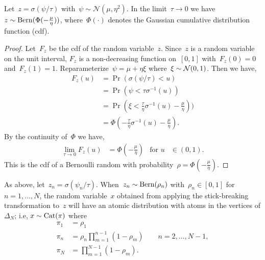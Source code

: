 \documentclass[twoside]{article}
\begin{document}
\begin{proposition}
  \label{prop:bernoulli}
  Let~${z=\sigma(\psi / \tau)}$
  with~${\psi\sim\mathcal{N}(\mu,\eta^2)}$.  In the
  limit~${\tau \to
    0}$ we have~${z \sim \mathrm{Bern}(\Phi(-\tfrac{\mu}{\eta}))}$,
  where~$\Phi(\cdot)$ denotes the Gaussian cumulative distribution
  function (cdf). 
\end{proposition}

\begin{proof}
  Let~$F_z$ be the cdf of the random variable~$z$. Since~$z$ is a random
  variable on the unit interval, $F_z$ is a non-decreasing function
  on~$[0,1]$ with~${F_z(0)=0}$ and~${F_z(1)=1}$.
  Reparameterize~${\psi = \mu + \eta \xi}$
  where~${\xi \sim \mathcal{N}(0,1)}$. Then we have,
  \begin{align*}
    F_z(u) &= \Pr(\sigma(\psi / \tau) < u) \\
         &= \Pr(\psi < \tau \sigma^{-1}(u)) \\
         &= \Pr(\xi < \tfrac{\tau}{\eta} \sigma^{-1}(u) - \tfrac{\mu}{\eta}))\\
         &= \Phi(-\tfrac{\tau}{\eta}\sigma^{-1}(u) - \tfrac{\mu}{\eta}).
  \end{align*}
  By the continuity of~$\Phi$ we have,
  \begin{align*}
    \lim_{\tau \to 0} F_z(u) &= \Phi(-\tfrac{\mu}{\eta}) &
    \text{for } u &\in (0,1).
  \end{align*}
  This is the cdf of a Bernoulli random with
  probability~${\rho = \Phi(-\tfrac{\mu}{\eta})}$.
\end{proof}

\begin{proposition}
  \label{prop:categorical}
  As above, let~${z_n=\sigma(\psi_n / \tau)}$.
  When~${z_n \sim \mathrm{Bern}(\rho_n)}$
  with~${\rho_n \in [0,1]}$ for~${n=1, \ldots, N}$, the random
  variable~$x$ obtained from applying the stick-breaking
  transformation to~$z$ will have an atomic distribution with atoms
  in the vertices of $\Delta_{N}$; i.e,
  ${x \sim \mathrm{Cat}(\pi)}$ where
  \begin{align*}
    \pi_1 &= \rho_1 \\
    \pi_n &=  \rho_n \prod_{m=1}^{n-1} (1-\rho_m)  \qquad
          n=2, \ldots, N-1, \\
    \pi_N &= \prod_{m=1}^{N-1} (1-\rho_m).
\end{align*}
\end{proposition}
\end{document}
